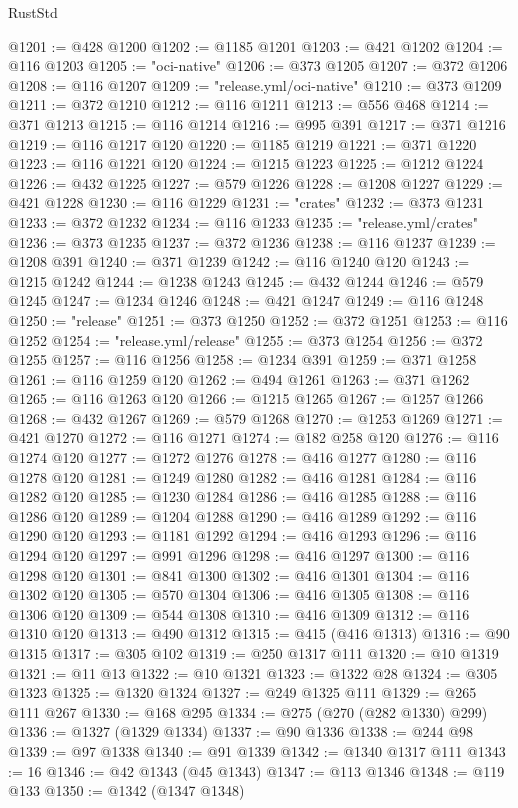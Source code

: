 \begin{lexlean}{RustStd}
\begin{coremodule}
@1201 := @428 @1200
@1202 := @1185 @1201
@1203 := @421 @1202
@1204 := @116 @1203
@1205 := "oci-native"
@1206 := @373 @1205
@1207 := @372 @1206
@1208 := @116 @1207
@1209 := "release.yml/oci-native"
@1210 := @373 @1209
@1211 := @372 @1210
@1212 := @116 @1211
@1213 := @556 @468
@1214 := @371 @1213
@1215 := @116 @1214
@1216 := @995 @391
@1217 := @371 @1216
@1219 := @116 @1217 @120
@1220 := @1185 @1219
@1221 := @371 @1220
@1223 := @116 @1221 @120
@1224 := @1215 @1223
@1225 := @1212 @1224
@1226 := @432 @1225
@1227 := @579 @1226
@1228 := @1208 @1227
@1229 := @421 @1228
@1230 := @116 @1229
@1231 := "crates"
@1232 := @373 @1231
@1233 := @372 @1232
@1234 := @116 @1233
@1235 := "release.yml/crates"
@1236 := @373 @1235
@1237 := @372 @1236
@1238 := @116 @1237
@1239 := @1208 @391
@1240 := @371 @1239
@1242 := @116 @1240 @120
@1243 := @1215 @1242
@1244 := @1238 @1243
@1245 := @432 @1244
@1246 := @579 @1245
@1247 := @1234 @1246
@1248 := @421 @1247
@1249 := @116 @1248
@1250 := "release"
@1251 := @373 @1250
@1252 := @372 @1251
@1253 := @116 @1252
@1254 := "release.yml/release"
@1255 := @373 @1254
@1256 := @372 @1255
@1257 := @116 @1256
@1258 := @1234 @391
@1259 := @371 @1258
@1261 := @116 @1259 @120
@1262 := @494 @1261
@1263 := @371 @1262
@1265 := @116 @1263 @120
@1266 := @1215 @1265
@1267 := @1257 @1266
@1268 := @432 @1267
@1269 := @579 @1268
@1270 := @1253 @1269
@1271 := @421 @1270
@1272 := @116 @1271
@1274 := @182 @258 @120
@1276 := @116 @1274 @120
@1277 := @1272 @1276
@1278 := @416 @1277
@1280 := @116 @1278 @120
@1281 := @1249 @1280
@1282 := @416 @1281
@1284 := @116 @1282 @120
@1285 := @1230 @1284
@1286 := @416 @1285
@1288 := @116 @1286 @120
@1289 := @1204 @1288
@1290 := @416 @1289
@1292 := @116 @1290 @120
@1293 := @1181 @1292
@1294 := @416 @1293
@1296 := @116 @1294 @120
@1297 := @991 @1296
@1298 := @416 @1297
@1300 := @116 @1298 @120
@1301 := @841 @1300
@1302 := @416 @1301
@1304 := @116 @1302 @120
@1305 := @570 @1304
@1306 := @416 @1305
@1308 := @116 @1306 @120
@1309 := @544 @1308
@1310 := @416 @1309
@1312 := @116 @1310 @120
@1313 := @490 @1312
@1315 := @415 (@416 @1313)
@1316 := @90 @1315
@1317 := @305 @102
@1319 := @250 @1317 @111
@1320 := @10 @1319
@1321 := @11 @13
@1322 := @10 @1321
@1323 := @1322 @28
@1324 := @305 @1323
@1325 := @1320 @1324
@1327 := @249 @1325 @111
@1329 := @265 @111 @267
@1330 := @168 @295
@1334 := @275 (@270 (@282 @1330) @299)
@1336 := @1327 (@1329 @1334)
@1337 := @90 @1336
@1338 := @244 @98
@1339 := @97 @1338
@1340 := @91 @1339
@1342 := @1340 @1317 @111
@1343 := 16
@1346 := @42 @1343 (@45 @1343)
@1347 := @113 @1346
@1348 := @119 @133
@1350 := @1342 (@1347 @1348)

\end{coremodule}
\end{lexlean}
